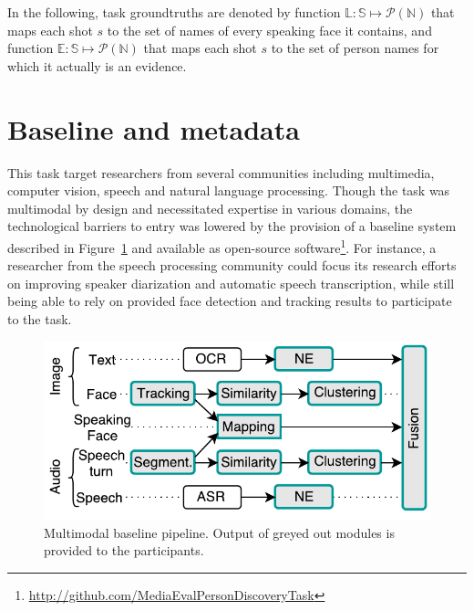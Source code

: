 \documentclass{acm_proc_article-me}
\newcommand\refEvidences{\mathbb{E}}
\newcommand\refLabels{\mathbb{L}}
\newcommand\refNames{\mathbb{N}}
\newcommand\shots{\mathbb{S}}
\begin{document}
In the following, task groundtruths are denoted by function $\refLabels : \shots \mapsto \mathcal{P}(\refNames)$ that maps each shot $s$ to the set of names of every speaking face it contains, and function $\refEvidences : \shots \mapsto \mathcal{P}(\refNames)$ that maps each shot $s$ to the set of person names for which it actually is an evidence.

\vspace{-0.1cm}
\section{Baseline and metadata}

This task target researchers from several communities including multimedia, computer vision, speech and natural language processing. Though the task was multimodal by design and necessitated expertise in various domains, the technological barriers to entry was lowered by the provision of a baseline system described in Figure~\ref{fig:baseline} and available as open-source software\footnote{\url{http://github.com/MediaEvalPersonDiscoveryTask}}.
For instance, a researcher from the speech processing community could focus its research efforts on improving speaker diarization and automatic speech transcription, while still being able to rely on provided face detection and tracking results to participate to the task.

\begin{figure}[htb]
 \centering
 \includegraphics[width=0.95\linewidth]{figs/baseline.pdf}
 \vspace{-0.6cm}
 \caption{Multimodal baseline pipeline. Output of greyed out modules is provided to the participants.}
 \label{fig:baseline}
\end{figure}
\end{document}
